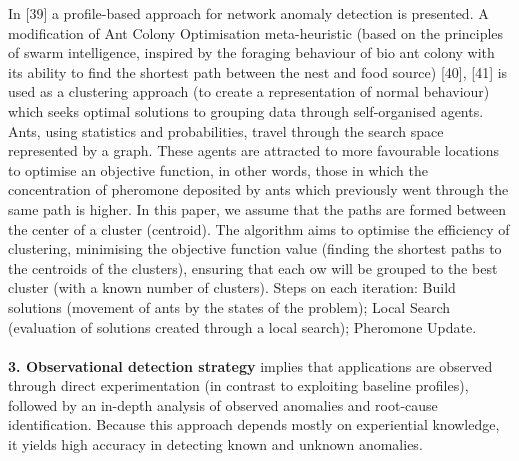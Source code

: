 \documentclass[]{usiinfprospectus}
\begin{document}
In [39] a profile-based approach for network anomaly detection is presented. A modification of Ant Colony Optimisation meta-heuristic (based on the principles of swarm intelligence, inspired by the foraging behaviour of bio ant colony with its ability to find the shortest path between the nest and food source) [40], [41] is used as a clustering approach (to create a representation of normal behaviour) which seeks optimal solutions to grouping data through self-organised agents. Ants, using statistics and probabilities, travel through the search space represented by a graph. These agents are attracted to more favourable locations to optimise an objective function, in other words, those in which the concentration of pheromone deposited by ants which previously went through the same path is higher. In this paper, we assume that the paths are formed between the center of a cluster (centroid). The algorithm aims to optimise the efficiency of clustering, minimising the objective function value (finding the shortest paths to the centroids of the clusters), ensuring that each ow will be grouped to the best cluster (with a known number of clusters). Steps on each iteration: Build solutions (movement of ants by the states of the problem); Local Search (evaluation of solutions created through a local search); Pheromone Update.\\\\
%
\textbf{3. Observational detection strategy} implies that applications are observed through direct experimentation (in contrast to exploiting baseline profiles), followed by an in-depth analysis of observed anomalies and root-cause identification. Because this approach depends mostly on experiential knowledge, it yields high accuracy in detecting known and unknown anomalies.\\\\
\end{document}

